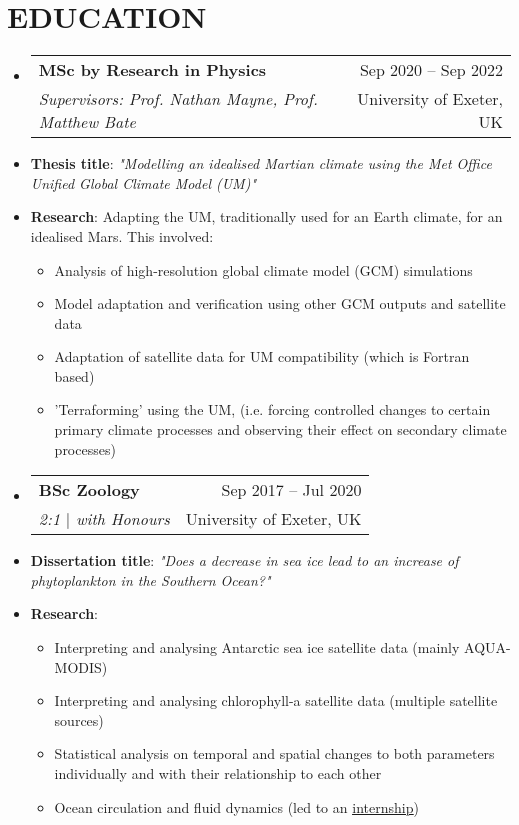 \documentclass[letterpaper,11pt]{article}
\makeatletter
\newcommand{\resumeItem}[1]{
  \item\small{
    {#1 \vspace{-1pt}}
  }
}
\newcommand{\resumeSubheading}[4]{
  \vspace{-1pt}\item
    \begin{tabular*}{\textwidth}[t]{l@{\extracolsep{\fill}}r}
      \textbf{#1} & {\color{dark-grey}\small #2}\vspace{1pt}\\ %
      \textit{#3} & {\color{dark-grey} \small #4}\\ %
    \end{tabular*}\vspace{-4pt}
}
\newcommand{\resumeSubHeadingListStart}{\begin{itemize}[leftmargin=0in, label={}]}
\newcommand{\resumeSubHeadingListEnd}{\end{itemize}}
\newcommand{\resumeItemListStart}{\begin{itemize}}
\newcommand{\resumeItemListEnd}{\end{itemize}\vspace{0pt}}
\makeatother
\begin{document}
\section {EDUCATION}
  \resumeSubHeadingListStart
    \resumeSubheading
      {MSc by Research in Physics}{Sep 2020 -- Sep 2022}
      {\textup{Supervisors: Prof. Nathan Mayne, Prof. Matthew Bate}}{University of Exeter, UK}
    	\resumeItem {\textbf{Thesis title}: \textit{"Modelling an idealised Martian climate using the Met Office Unified Global Climate Model (UM)"}}
        \resumeItem 
            {\textbf{Research}: Adapting the UM, traditionally used for an Earth climate, for an idealised Mars. This involved:}
            \resumeItemListStart
                \resumeItem {Analysis of high-resolution global climate model (GCM) simulations}
                \resumeItem {Model adaptation and verification using other GCM outputs and satellite data}
                \resumeItem {Adaptation of satellite data for UM compatibility (which is Fortran based)}
                \resumeItem {'Terraforming' using the UM, (i.e. forcing controlled changes to certain primary climate processes and observing their effect on secondary climate processes)}
            \resumeItemListEnd
  \resumeSubHeadingListEnd
  \resumeSubHeadingListStart
    \resumeSubheading
      {BSc Zoology}{Sep 2017 -- Jul 2020}
      {\textup{2:1 $|$ with Honours}}{University of Exeter, UK}
    	\resumeItem {\textbf{Dissertation title}: \textit{"Does a decrease in sea ice lead to an increase of phytoplankton in the Southern Ocean?"}}
        \resumeItem 
            {\textbf{Research}:}
            \resumeItemListStart
                \resumeItem {Interpreting and analysing Antarctic sea ice satellite data (mainly AQUA-MODIS)}
                \resumeItem {Interpreting and analysing chlorophyll-a satellite data (multiple satellite sources)}
                \resumeItem {Statistical analysis on temporal and spatial changes to both parameters individually and with their relationship to each other}
                \resumeItem {Ocean circulation and fluid dynamics (led to an  \underline{\hyperref[sec:internships]{internship}})}
                
            \resumeItemListEnd
  \resumeSubHeadingListEnd

\end{document}
